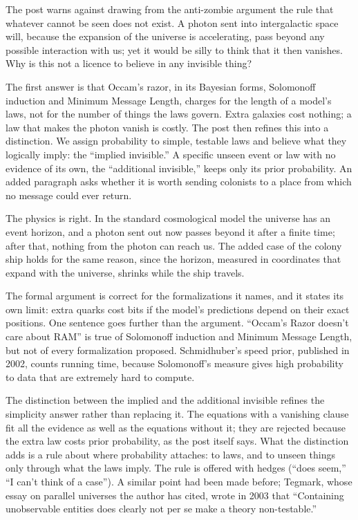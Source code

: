 \begin{afterword}
\summaryhead

The post warns against drawing from the anti-zombie argument the rule that whatever cannot be seen does not exist. A photon sent into intergalactic space will, because the expansion of the universe is accelerating, pass beyond any possible interaction with us; yet it would be silly to think that it then vanishes. Why is this not a licence to believe in any invisible thing?

The first answer is that Occam's razor, in its Bayesian forms, Solomonoff induction and Minimum Message Length, charges for the length of a model's laws, not for the number of things the laws govern. Extra galaxies cost nothing; a law that makes the photon vanish is costly. The post then refines this into a distinction. We assign probability to simple, testable laws and believe what they logically imply: the ``implied invisible.'' A specific unseen event or law with no evidence of its own, the ``additional invisible,'' keeps only its prior probability. An added paragraph asks whether it is worth sending colonists to a place from which no message could ever return.

\responsehead

The physics is right. In the standard cosmological model the universe has an event horizon, and a photon sent out now passes beyond it after a finite time; after that, nothing from the photon can reach us. The added case of the colony ship holds for the same reason, since the horizon, measured in coordinates that expand with the universe, shrinks while the ship travels.

The formal argument is correct for the formalizations it names, and it states its own limit: extra quarks cost bits if the model's predictions depend on their exact positions. One sentence goes further than the argument. ``Occam's Razor doesn't care about RAM'' is true of Solomonoff induction and Minimum Message Length, but not of every formalization proposed. Schmidhuber's speed prior, published in 2002, counts running time, because Solomonoff's measure gives high probability to data that are extremely hard to compute.

The distinction between the implied and the additional invisible refines the simplicity answer rather than replacing it. The equations with a vanishing clause fit all the evidence as well as the equations without it; they are rejected because the extra law costs prior probability, as the post itself says. What the distinction adds is a rule about where probability attaches: to laws, and to unseen things only through what the laws imply. The rule is offered with hedges (``does seem,'' ``I can't think of a case''). A similar point had been made before; Tegmark, whose essay on parallel universes the author has cited, wrote in 2003 that ``Containing unobservable entities does clearly not per se make a theory non-testable.''


\end{afterword}
